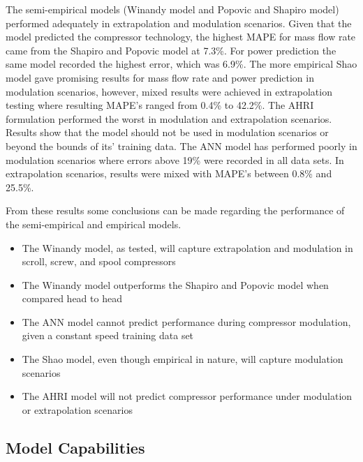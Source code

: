 \documentclass[preprint,11pt,authoryear]{elsarticle}
\begin{document}
The semi-empirical models (Winandy model and Popovic and Shapiro model) performed adequately in extrapolation and modulation scenarios. Given that the model predicted the compressor technology, the highest MAPE for mass flow rate came from the Shapiro and Popovic model at 7.3\%. For power prediction the same model recorded the highest error, which was 6.9\%. The more empirical Shao model gave promising results for mass flow rate and power prediction in modulation scenarios, however, mixed results were achieved in extrapolation testing where resulting MAPE's ranged from 0.4\% to 42.2\%. The AHRI formulation performed the worst in modulation and extrapolation scenarios. Results show that the model should not be used in modulation scenarios or beyond the bounds of its' training data. The ANN model has performed poorly in modulation scenarios where errors above 19\% were recorded in all data sets. In extrapolation scenarios, results were mixed with MAPE's between 0.8\% and 25.5\%. 

From these results some conclusions can be made regarding the performance of the semi-empirical and empirical models.
\begin{itemize}
\item The Winandy model, as tested, will capture extrapolation and modulation in scroll, screw, and spool compressors
\end{itemize}
\begin{itemize}
\item The Winandy model outperforms the Shapiro and Popovic model when compared head to head
\end{itemize}
\begin{itemize}
\item The ANN model cannot predict performance during compressor modulation, given a constant speed training data set
\end{itemize}
\begin{itemize}
\item The Shao model, even though empirical in nature, will capture modulation scenarios
\end{itemize}
\begin{itemize}
\item The AHRI model will not predict compressor performance under modulation or extrapolation scenarios
\end{itemize}

\subsection{Model Capabilities}
\end{document}
